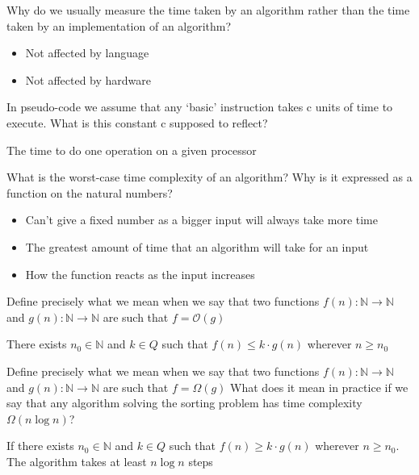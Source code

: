 \documentclass[addpoints]{exam}
\begin{document}
\begin{questions}
\question[2]Why do we usually measure the time taken by an algorithm rather than
the time taken by an implementation of an algorithm?
\begin{solution}[2in]
	\begin{itemize}
		\item Not affected by language
		\item Not affected by hardware
	\end{itemize}
\end{solution}

\question[2]In pseudo-code we assume that any ‘basic’ instruction takes c units of
time to execute. What is this constant c supposed to reflect?
\begin{solution}[2in]
	The time to do one operation on a given processor
\end{solution}

\question[4]What is the worst-case time complexity of an algorithm? Why is it
expressed as a function on the natural numbers? 
\begin{solution}[2in]
	\begin{itemize}
		\item Can't give a fixed number as a bigger input will always take more time
		\item The greatest amount of time that an algorithm will take for an input
		\item How the function reacts as the input increases
	\end{itemize}
\end{solution}

\question[2]Define precisely what we mean when we say that two functions $f(n):\mathbb{N}\rightarrow\mathbb{N}$ and $g(n):\mathbb{N}\rightarrow\mathbb{N}$ are such that $f=\mathcal{O}(g)$
\begin{solution}[2in]
	There exists $n_0\in \mathbb{N}$ and $k\in Q$ such that $f(n)\leqslant k\cdot g(n)$ wherever $n\geqslant n_0$
\end{solution}

Define precisely what we mean when we say that two functions $f(n):\mathbb{N}\rightarrow\mathbb{N}$ and $g(n):\mathbb{N}\rightarrow\mathbb{N}$ are such that $f=\Omega(g)$ What does it mean in practice if we say that any algorithm solving the sorting problem has time complexity $\Omega(n\log n)$?
\begin{solution}[2in]
	If there exists $n_0\in \mathbb{N}$ and $k\in Q$ such that $f(n)\geqslant k\cdot g(n)$ wherever $n\geqslant n_0$. The algorithm takes at least $n\log n$ steps
\end{solution}


\end{questions}
\end{document}
